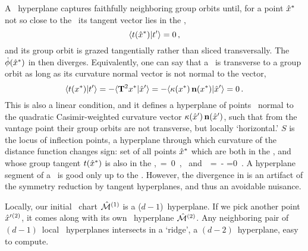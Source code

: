 A \slice\ hyperplane captures faithfully neighboring group orbits until,
for a point $\hat{x}^\ast$ not so close to the \template\ its tangent vector
lies in the \slice,
\[
\braket{\groupTan(\sspRSing)}{\sliceTan{}}= 0
\,,
\]
and its group orbit is grazed tangentially rather than sliced transversally.
The {\phaseVel} $\dot{{\bf \phi}}(\hat{x}^\ast)$ in
 then diverges. Equivalently,
one can say that a \slice\ is transverse to a group orbit as long as its
curvature normal vector  is not normal to the {\template} vector,
\[
\braket{\groupTan(\sspSing)}{\sliceTan{}}
 =
-\braket{\Lg^2\sspSing}{\slicep}
 =
-\braket{\kappa(\sspSing) \,{\bf n}(\sspSing)}{\slicep}
 = 0
\,.
\]
This is also a linear condition, and it defines a hyperplane of points
\sspSing\ normal to  the quadratic Casimir-weighted curvature vector
$\kappa({\hat{x}'}) \, {\bf n}({\hat{x}'})$, such that from the {\template} vantage
point their group orbits are not transverse, but locally `horizontal.'
{\Sset} $S$ is the locus of inflection points, a hyperplane through which
curvature of the distance function changes sign:
set of all points
$\hat{x}^\ast$ which are both in the {\slice}, and whose group tangent
$t(\hat{x}^\ast)$ is also in the  {\slice},
\beq
\braket{\sspRSing}{\sliceTan{}} \,=\, 0
    \,, \mbox{ and }
\braket{\groupTan(\sspRSing)}{\sliceTan{}}
 \,=\,
-
 =0
\,.
\label{sliceSingl0}
\eeq
A hyperplane segment of a \slice\ is good only up to the \sset. However,
the divergence in {\phaseVel}  is an artifact of the
symmetry reduction by tangent hyperplanes, and thus an avoidable
nuisance.

Locally, our initial \slice\ chart $\hat{\cal M}{}^{(1)}$ is a ($d\!-\!1$)\dmn\
hyperplane. If we pick another {\template} point ${\hat{x}'}{}^{(2)}$, it
comes along with its own \slice\ hyperplane $\hat{\cal M}{}^{(2)}$. Any
neighboring pair of $(d\!-\!1)$\dmn\ local \slice\ hyperplanes intersects
in a `ridge',
a $(d\!-\!2)$\dmn\ hyperplane, easy to compute.

